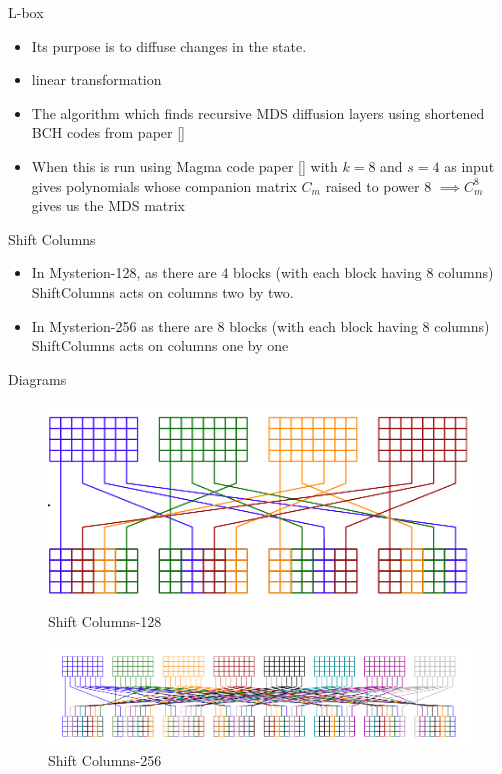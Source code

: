 \begin{frame}{L-box}

    \begin{itemize}
        \item Its purpose is to diffuse changes in the state.
        \item linear transformation
        \item The algorithm which finds recursive MDS diffusion layers using shortened BCH codes from paper []
        \item When this is run using Magma code paper [] with $k =8$ and $s = 4$ as input gives polynomials whose companion matrix $C_m$ raised to power $8$ $\implies C^8_m$ gives us the MDS matrix 
     \end{itemize}
\end{frame}
\begin{frame}{Shift Columns}

    \begin{itemize}
        \item In Mysterion-128, as there are 4 blocks (with each block having 8 columns) ShiftColumns acts on columns two by two.
        \item In Mysterion-256 as there are 8 blocks (with each block having 8 columns) ShiftColumns acts on columns one by one
    \end{itemize}
\end{frame}

\begin{frame}{Diagrams}


\begin{center}
\begin{figure}[h!]
  \caption{Shift Columns-128}
   \includegraphics[width=6cm\textwidth]{128.png} 
\end{figure}
   
\end{center}

\begin{center}
\begin{figure}[h!]
  \caption{Shift Columns-256}
   \includegraphics[width=10cm\textwidth]{256.png} 
\end{figure}
\end{center}

\end{frame}

